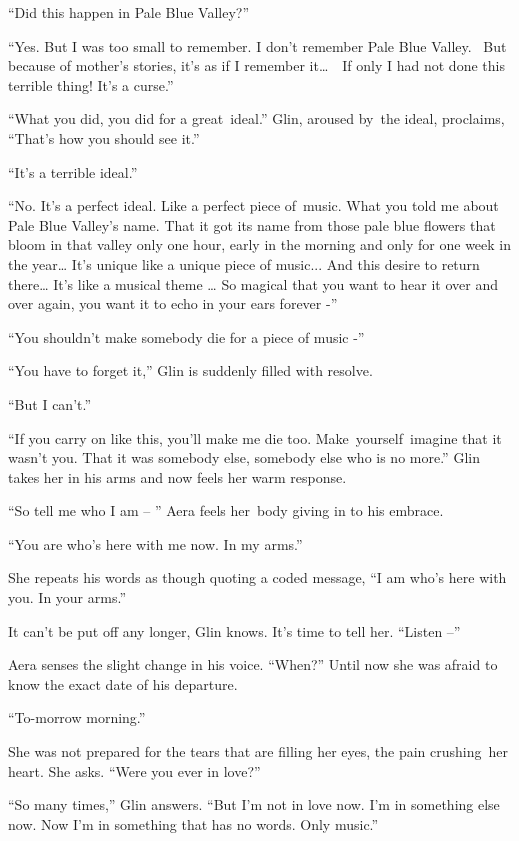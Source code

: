 \documentclass[twoside,11pt]{book}
\begin{document}
``Did this happen in Pale Blue Valley?'' 

``Yes. But I was too small to remember. I don't remember Pale Blue Valley. ~But because of mother's
stories, it's as if I remember it{\dots}\ \ If only I had not done this terrible thing! It's a curse.'' 

``What you did, you did for a great~ideal.'' Glin, aroused by{\ }the ideal, proclaims,
``That's how you should see it.'' 

``It's a terrible ideal.'' 

``No. It's a perfect ideal. Like a perfect piece of~music. What you told me about Pale Blue Valley's name.
That it got its name from those pale blue flowers that bloom in that valley only one hour, early in the morning and
only for one week in the year{\dots} It's unique like a unique piece of music... And this desire to return there{\dots}
It's like a musical theme {\dots} So magical that you want to hear it over and over again, you want it to echo in your
ears forever -'' 

``You shouldn't make somebody die for a piece of music -'' 

``You have to forget it,'' Glin is suddenly filled with resolve.\ \ 

``But I can't.'' 

``If you carry on like this, you'll make me die too.
Make{\ }yourself{\ }imagine that it wasn't you. That it was somebody else, somebody else
who is no more.'' Glin takes her in his arms and now feels her warm response. 

``So tell me who I am -- '' Aera feels her\ body giving in to his embrace.

``You are who's here with me now. In my arms.'' 

She repeats his words as though quoting a coded message, ``I am who's here with you. In your
arms.''

It can't be put off any longer, Glin knows. It's time to tell her. ``Listen --'' 

Aera senses the slight change in his voice. ``When?'' Until now she was afraid to know the
exact date of his departure.

``To-morrow morning.'' 

She was not prepared for the tears that are filling her eyes, the pain crushing~her heart. She asks. ``Were
you ever in love?'' 

``So many times,'' Glin answers. ``But I'm not in love now. I'm in something else
now. Now I'm in something that has no words. Only music.'' ~
\end{document}

